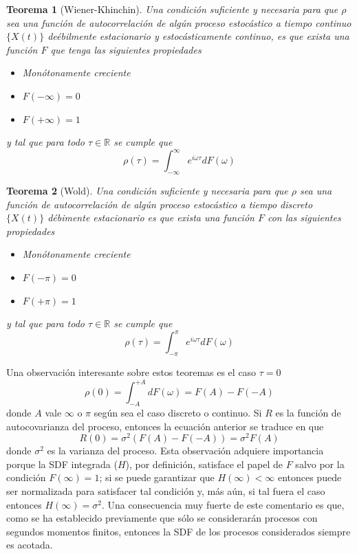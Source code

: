 \documentclass[12pt,a4paper]{mitthesis}
\newtheorem{thrm}{Teorema}
\newcommand{\R}{\mathbb{R}}
\newcommand{\intR}{\int_{-\infty}^{\infty}}
\newcommand{\intPI}{\int_{-\pi}^{\pi}}
\begin{document}
\begin{thrm}[Wiener-Khinchin]
Una condici\'on suficiente y necesaria para que $\rho$ sea una funci\'on de autocorrelaci\'on de 
alg\'un proceso estoc\'astico a tiempo continuo $\{X(t)\}$ de\'ebilmente estacionario y 
estoc\'asticamente continuo, es que exista una funci\'on $F$ que tenga las siguientes propiedades
\begin{itemize}
\item Monótonamente creciente
\item $F(-\infty) = 0$
\item $F(+\infty) = 1$
\end{itemize}
y tal que para todo $\tau \in \R$ se cumple que
\begin{equation*}
\rho(\tau) = \intR e^{i \omega \tau} dF(\omega)
\end{equation*}
\label{t_wienerkhinchin}
\end{thrm}

\begin{thrm}[Wold]
Una condici\'on suficiente y necesaria para que $\rho$ sea una funci\'on de autocorrelaci\'on de 
alg\'un proceso estoc\'astico a tiempo discreto $\{X(t)\}$ d\'ebimente estacionario es que exista 
una funci\'on $F$ con las siguientes propiedades
\begin{itemize}
\item Monótonamente creciente
\item $F(-\pi) = 0$
\item $F(+\pi) = 1$
\end{itemize}
y tal que para todo $\tau \in \R$ se cumple que
\begin{equation*}
\rho(\tau) = \intPI e^{i \omega \tau} dF(\omega)
\end{equation*}
\label{t_wold}
\end{thrm}

Una observaci\'on interesante sobre estos teoremas es el caso $\tau = 0$
\begin{equation*}
\rho(0) = \int_{-A}^{+A} dF(\omega) = F(A) - F(-A)
\end{equation*}
donde $A$ vale $\infty$ o $\pi$ seg\'un sea el caso discreto o continuo. Si $R$ es la funci\'on de
autocovarianza del proceso, entonces la ecuaci\'on anterior se traduce en que
\begin{equation*}
R(0) = \sigma^{2} \left( F(A) - F(-A) \right) = \sigma^{2} F(A)
\end{equation*}
donde $\sigma^{2}$ es la varianza del proceso. 
Esta observaci\'on adquiere importancia porque la SDF integrada ($H$), por definici\'on, satisface 
el papel de $F$ salvo por la condici\'on $F(\infty)=1$; si se puede garantizar que 
$H(\infty)<\infty$ entonces puede ser normalizada para satisfacer tal condici\'on y, m\'as a\'un,
si tal fuera el caso entonces $H(\infty)=\sigma^{2}$. Una consecuencia muy fuerte de este 
comentario es que, como se ha establecido previamente que s\'olo se considerar\'an procesos con
segundos momentos finitos, entonces la SDF de los procesos considerados siempre es acotada.
\end{document}
